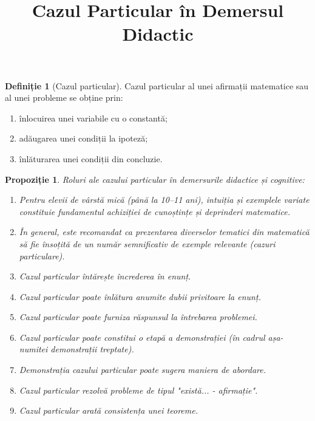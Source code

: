 \documentclass[12pt]{article}
\title{Cazul Particular în Demersul Didactic}
\author{}
\date{}
\theoremstyle{definition}
\newtheorem{definition}{Definiție}
\theoremstyle{plain}
\newtheorem{proposition}{Propoziție}
\begin{document}
\maketitle

\begin{definition}[Cazul particular]
Cazul particular al unei afirmații matematice sau al unei probleme se obține prin:
\begin{enumerate}
    \item înlocuirea unei variabile cu o constantă;
    \item adăugarea unei condiții la ipoteză;
    \item înlăturarea unei condiții din concluzie.
\end{enumerate}
\end{definition}

\begin{proposition}Roluri ale cazului particular în demersurile didactice și cognitive:
\begin{enumerate}
    \item Pentru elevii de vârstă mică (până la 10–11 ani), intuiția și exemplele variate constituie fundamentul achiziției de cunoștințe și deprinderi matematice.
    \item În general, este recomandat ca prezentarea diverselor tematici din matematică să fie însoțită de un număr semnificativ de exemple relevante (cazuri particulare).
    \item Cazul particular întărește încrederea în enunț.
    \item Cazul particular poate înlătura anumite dubii privitoare la enunț.
    \item Cazul particular poate furniza răspunsul la întrebarea problemei.
    \item Cazul particular poate constitui o etapă a demonstrației (în cadrul așa-numitei demonstrații treptate).
    \item Demonstrația cazului particular poate sugera maniera de abordare.
    \item Cazul particular rezolvă probleme de tipul "există... - afirmație".
    \item Cazul particular arată consistența unei teoreme.
\end{enumerate}
\end{proposition}
\end{document}
